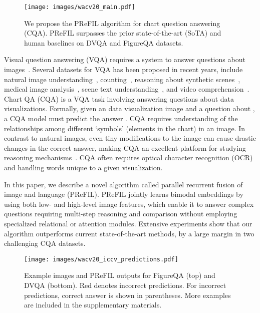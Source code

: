 \documentclass[10pt,twocolumn]{article}
\begin{document}
\begin{figure}[t]
    \centering
    \texttt{[image: images/wacv20\_main.pdf]}
    \caption{We propose the PReFIL algorithm for chart question answering (CQA). PReFIL surpasses the prior state-of-the-art (SoTA) and human baselines on DVQA and FigureQA datasets.}
    \label{fig:overview}
\end{figure}

Visual question answering (VQA) requires a system to answer questions about images~\cite{antol2015vqa,malinowski2014multi,kafle2016review,kafle2017data}. Several datasets for VQA has been proposed in recent years, include natural image understanding~\cite{malinowski2014multi,antol2015vqa}, counting~\cite{acharya2019tallyqa}, reasoning about synthetic scenes~\cite{johnson2016clevr}, medical image analysis~\cite{lau2018dataset}, scene text understanding~\cite{Singh2019TowardsVM}, and video comprehension~\cite{jang2017tgif}. Chart QA (CQA) is a VQA task involving answering questions about data visualizations. Formally, given an data visualization image  and a question  about , a CQA model must predict the answer . CQA requires understanding of the relationships among  different `symbols' (elements in the chart) in an image. In contrast to natural images, even tiny modifications to the image can cause drastic changes in the correct answer, making CQA an excellent platform for studying reasoning mechanisms~\cite{figureqa,kafle2018dvqa}. CQA often requires optical character recognition (OCR) and handling words unique to a given visualization.

In this paper, we describe a novel algorithm called parallel recurrent fusion of image and language (PReFIL). PReFIL jointly learns bimodal embeddings by using both low- and high-level image features, which enable it to answer complex questions requiring multi-step reasoning and comparison without employing specialized relational or attention modules. Extensive experiments show that our algorithm outperforms current state-of-the-art methods, by a large margin in two challenging CQA datasets.

\vspace{1cm}

\begin{figure*}[t!]
    \centering
    \texttt{[image: images/wacv20\_iccv\_predictions.pdf]}
    \caption{Example images and PReFIL outputs for FigureQA (top) and DVQA (bottom). Red denotes incorrect predictions. For incorrect predictions, correct answer is shown in parentheses. More examples are included in the supplementary materials. \label{fig:dvqa-examples}}
\end{figure*}
\end{document}
